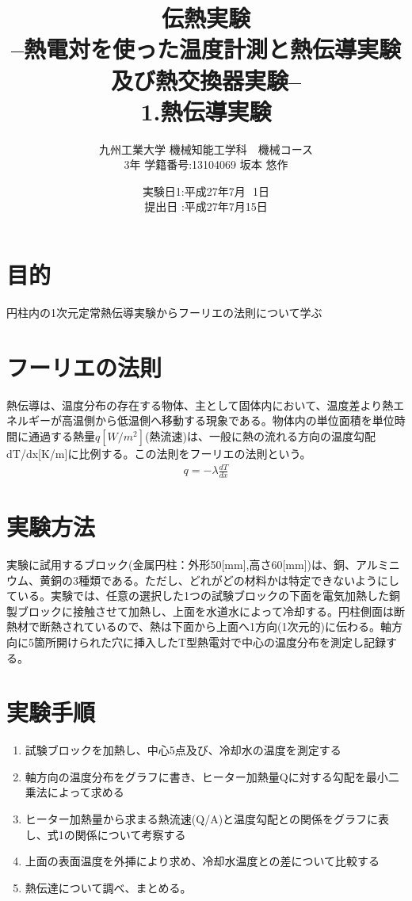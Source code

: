 \documentclass[a4j,twoside,openright,11pt]{jarticle}
\title{伝熱実験\\--熱電対を使った温度計測と熱伝導実験及び熱交換器実験--\\1.熱伝導実験}
\author{九州工業大学 機械知能工学科　機械コース\\3年 学籍番号:13104069 坂本 悠作}
\date{
実験日1:平成27年7月\,\,\,\,1日\\
提出日 :平成27年7月15日
}
\begin{document}
\maketitle
\newpage

\section{目的}
円柱内の1次元定常熱伝導実験からフーリエの法則について学ぶ
\section{フーリエの法則}
熱伝導は、温度分布の存在する物体、主として固体内において、温度差より熱エネルギーが高温側から低温側へ移動する現象である。物体内の単位面積を単位時間に通過する熱量$q[W/m^2]$(熱流速)は、一般に熱の流れる方向の温度勾配dT/dx[K/m]に比例する。この法則をフーリエの法則という。
\begin{eqnarray}
q = -\lambda \frac{dT}{dx}
\end{eqnarray}


\section{実験方法}
実験に試用するブロック(金属円柱：外形50[mm],高さ60[mm])は、銅、アルミニウム、黄銅の3種類である。ただし、どれがどの材料かは特定できないようにしている。実験では、任意の選択した1つの試験ブロックの下面を電気加熱した銅製ブロックに接触させて加熱し、上面を水道水によって冷却する。円柱側面は断熱材で断熱されているので、熱は下面から上面へ1方向(1次元的)に伝わる。軸方向に5箇所開けられた穴に挿入したT型熱電対で中心の温度分布を測定し記録する。

\section{実験手順}
\begin{enumerate}
\item 試験ブロックを加熱し、中心5点及び、冷却水の温度を測定する
\item 軸方向の温度分布をグラフに書き、ヒーター加熱量Qに対する勾配を最小二乗法によって求める
\item ヒーター加熱量から求まる熱流速(Q/A)と温度勾配との関係をグラフに表し、式1の関係について考察する
\item 上面の表面温度を外挿により求め、冷却水温度との差について比較する
\item 熱伝達について調べ、まとめる。
\end{enumerate}
\end{document}
